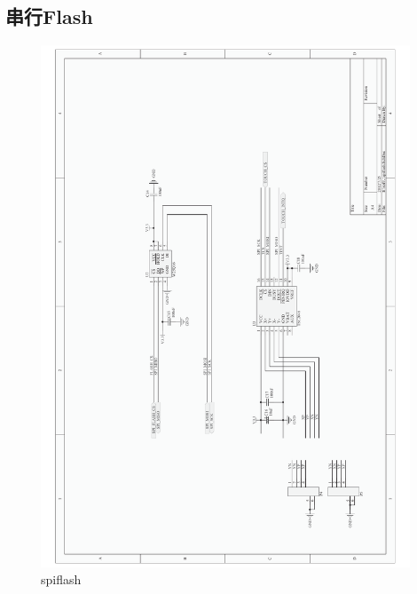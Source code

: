 \documentclass[titlepage]{article}
\begin{document}
 \subsection{串行Flash}
 \begin{figure}[h]
  \centering
 \includegraphics[width=11cm]{spiflash.pdf}
 \caption{spiflash}
 \end{figure}

 \newpage
\end{document}
